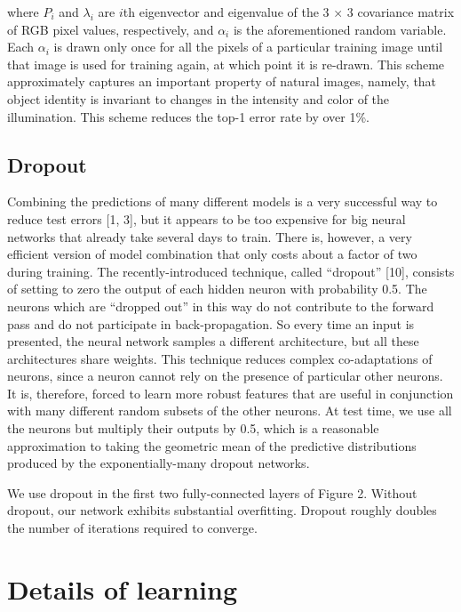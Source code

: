 \documentclass[12pt,a4paper,UTF8,twoside]{book}
\begin{document}
where \(P_i\) and \(\lambda_i\) are \(i\)th eigenvector and eigenvalue of the 3 × 3 covariance matrix of RGB pixel values, respectively, and \(\alpha_i\) is the aforementioned random variable. Each \(\alpha_i\) is drawn only once for all the pixels of a particular training image until that image is used for training again, at which point it is re-drawn. This scheme approximately captures an important property of natural images, namely, that object identity is invariant to changes in the intensity and color of the illumination. This scheme reduces the top-1 error rate by over 1\%.

\hypertarget{dropout}{%
\subsection{Dropout}\label{dropout}}

Combining the predictions of many different models is a very successful way to reduce test errors {[}1, 3{]}, but it appears to be too expensive for big neural networks that already take several days to train. There is, however, a very efficient version of model combination that only costs about a factor of two during training. The recently-introduced technique, called ``dropout'' {[}10{]}, consists of setting to zero the output of each hidden neuron with probability 0.5. The neurons which are ``dropped out'' in this way do not contribute to the forward pass and do not participate in back-propagation. So every time an input is presented, the neural network samples a different architecture, but all these architectures share weights. This technique reduces complex co-adaptations of neurons, since a neuron cannot rely on the presence of particular other neurons. It is, therefore, forced to learn more robust features that are useful in conjunction with many different random subsets of the other neurons. At test time, we use all the neurons but multiply their outputs by 0.5, which is a reasonable approximation to taking the geometric mean of the predictive distributions produced by the exponentially-many dropout networks.

We use dropout in the first two fully-connected layers of Figure 2. Without dropout, our network exhibits substantial overfitting. Dropout roughly doubles the number of iterations required to converge.

\hypertarget{details-of-learning}{%
\section{Details of learning}\label{details-of-learning}}
\end{document}
